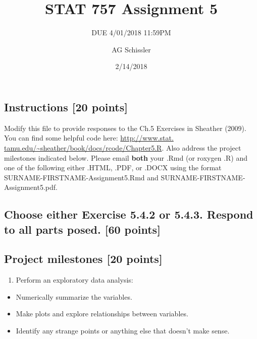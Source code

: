 \documentclass[]{article}
\title{STAT 757 Assignment 5}
\subtitle{DUE 4/01/2018 11:59PM}
\author{AG Schissler}
\date{2/14/2018}
\providecommand{\tightlist}{%
  \setlength{\itemsep}{0pt}\setlength{\parskip}{0pt}}
\begin{document}
\maketitle

\hypertarget{instructions-20-points}{%
\subsection{Instructions {[}20 points{]}}\label{instructions-20-points}}

Modify this file to provide responses to the Ch.5 Exercises in Sheather
(2009). You can find some helpful code here:
\href{http://www.stat.tamu.edu/~sheather/book/docs/rcode/Chapter5.R}{http://www.stat.
tamu.edu/\textasciitilde{}sheather/book/docs/rcode/Chapter5.R}. Also
address the project milestones indicated below. Please email
\textbf{both} your .Rmd (or roxygen .R) and one of the following either
.HTML, .PDF, or .DOCX using the format SURNAME-FIRSTNAME-Assignment5.Rmd
and SURNAME-FIRSTNAME-Assignment5.pdf.

\hypertarget{choose-either-exercise-5.4.2-or-5.4.3.-respond-to-all-parts-posed.-60-points}{%
\subsection{Choose either Exercise 5.4.2 or 5.4.3. Respond to all parts
posed. {[}60
points{]}}\label{choose-either-exercise-5.4.2-or-5.4.3.-respond-to-all-parts-posed.-60-points}}

\hypertarget{project-milestones-20-points}{%
\subsection{Project milestones {[}20
points{]}}\label{project-milestones-20-points}}

\begin{enumerate}
\def\labelenumi{\arabic{enumi}.}
\tightlist
\item
  Perform an exploratory data analysis:
\end{enumerate}

\begin{itemize}
\tightlist
\item
  Numerically summarize the variables.
\item
  Make plots and explore relationships between variables.
\item
  Identify any strange points or anything else that doesn't make sense.
\end{itemize}
\end{document}

